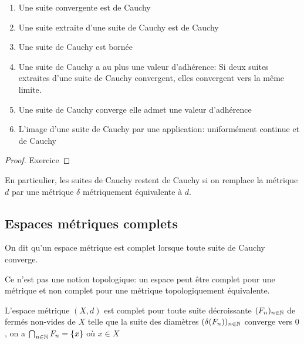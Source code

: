 \documentclass[]{report}
\begin{document}
    \begin{prop}{}{}
        \begin{enumerate}
            \item Une suite convergente est de Cauchy
            \item Une suite extraite d'une suite de Cauchy est de Cauchy
            \item Une suite de Cauchy est bornée
            \item Une suite de Cauchy a au plus une valeur d'adhérence: Si deux suites extraites d'une suite de Cauchy convergent, elles convergent vers la même limite.
            \item Une suite de Cauchy converge \ssi elle admet une valeur d'adhérence
            \item L'image d'une suite de Cauchy par une application: uniformément continue et de Cauchy
        \end{enumerate}
    \end{prop}

    \begin{proof}
        Exercice
    \end{proof}

    \begin{re}{}{}
        En particulier, les suites de Cauchy restent de Cauchy si on remplace la métrique $d$ par une métrique $\delta$ métriquement équivalente à $d$.
    \end{re}

    \subsection*{Espaces métriques complets}

    \begin{df}{}{}
        On dit qu'un espace métrique est complet lorsque toute suite de Cauchy converge.
    \end{df}

    \begin{re}{}{}
        Ce n'est pas une notion topologique: un espace peut être complet pour une métrique et non complet pour une métrique topologiquement équivalente.
    \end{re}

    \begin{prop}{}{}
        L'espace métrique $(X,d)$ est complet \ssi pour toute suite décroissante $(F_n)_{{n\in\mathbb{N}}}$ de fermés non-vides de $X$ telle que la suite des diamètres $(\delta(F_n))_{n\in\mathbb{N}}$ converge vers $0$, on a $\bigcap_{n\in\mathbb{N}} F_n=\{x\}$ où $x\in X$
    \end{prop}
\end{document}
